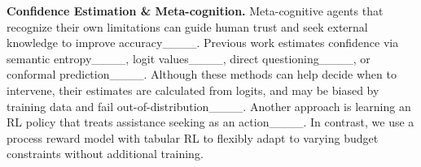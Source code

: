 \textbf{Confidence Estimation \& Meta-cognition.} Meta-cognitive agents that recognize their own limitations can guide human trust and seek external knowledge to improve accuracy____. Previous work estimates confidence via semantic entropy____, logit values____, direct questioning____, or conformal prediction____. Although these methods can help decide when to intervene, their estimates are calculated from logits, and may be biased by training data and fail out-of-distribution____. Another approach is learning an RL policy that treats assistance seeking as an action____. In contrast, we use a process reward model with tabular RL to flexibly adapt to varying budget constraints without additional training.